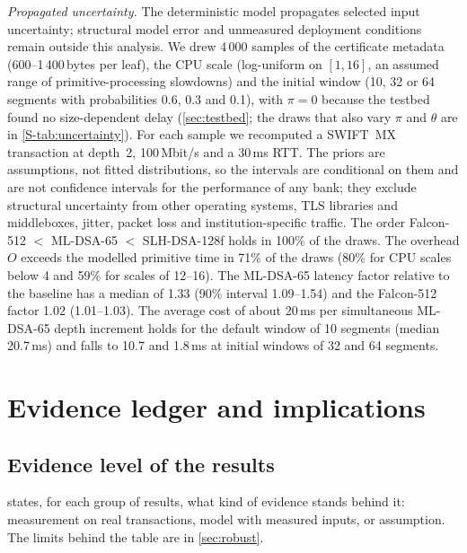 \documentclass[preprint,12pt]{elsarticle}
\newcommand{\ms}{\,ms\xspace}
\newcommand{\Mbits}{\,Mbit/s\xspace}
\begin{document}
\emph{Propagated uncertainty.} The deterministic model propagates selected input uncertainty; structural model error and unmeasured deployment conditions remain outside this analysis. We drew 4\,000 samples of the certificate metadata (600--1\,400\,bytes per leaf), the CPU scale (log-uniform on $[1,16]$, an assumed range of primitive-processing slowdowns) and the initial window (10, 32 or 64 segments with probabilities 0.6, 0.3 and 0.1), with $\pi=0$ because the testbed found no size-dependent delay (\cref{sec:testbed}; the draws that also vary $\pi$ and $\theta$ are in \cref{S-tab:uncertainty}). For each sample we recomputed a SWIFT~MX transaction at depth~2, 100\Mbits and a 30\ms RTT. The priors are assumptions, not fitted distributions, so the intervals are conditional on them and are not confidence intervals for the performance of any bank; they exclude structural uncertainty from other operating systems, TLS libraries and middleboxes, jitter, packet loss and institution-specific traffic. The order Falcon-512 $<$ ML-DSA-65 $<$ SLH-DSA-128f holds in 100\% of the draws. The overhead $O$ exceeds the modelled primitive time in 71\% of the draws (80\% for CPU scales below 4 and 59\% for scales of 12--16). The ML-DSA-65 latency factor relative to the baseline has a median of 1.33 (90\% interval 1.09--1.54) and the Falcon-512 factor 1.02 (1.01--1.03). The average cost of about 20\ms per simultaneous ML-DSA-65 depth increment holds for the default window of 10 segments (median 20.7\ms) and falls to 10.7 and 1.8\ms at initial windows of 32 and 64 segments.

\section{Evidence ledger and implications}
\label{sec:discussion}
\subsection{Evidence level of the results}
 states, for each group of results, what kind of evidence stands behind it: measurement on real transactions, model with measured inputs, or assumption. The limits behind the table are in \cref{sec:robust}.
\end{document}
